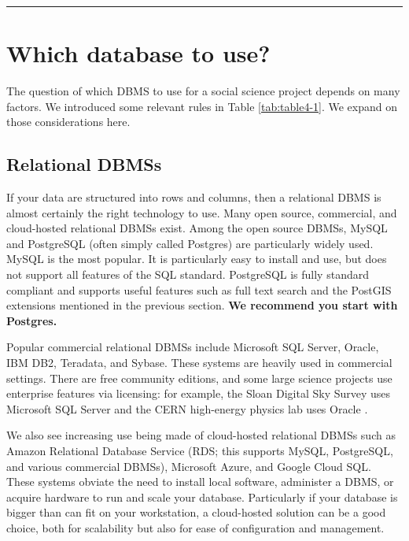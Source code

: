\documentclass[]{krantz}
\begin{document}
\begin{center}\rule{0.5\linewidth}{\linethickness}\end{center}

\section{Which database to use?}\label{which-database-to-use}

The question of which DBMS to use for a social science project depends
on many factors. We introduced some relevant rules in Table
\ref{tab:table4-1}. We expand on those considerations here.

\subsection{Relational DBMSs}\label{relational-dbmss-1}

If your data are structured into rows and columns, then a relational
DBMS is almost certainly the right technology to use. Many open source,
commercial, and cloud-hosted relational DBMSs exist. Among the open
source DBMSs, MySQL and PostgreSQL (often simply called Postgres) are
particularly widely used. MySQL is the most popular. It is particularly
easy to install and use, but does not support all features of the SQL
standard. PostgreSQL is fully standard compliant and supports useful
features such as full text search and the PostGIS extensions mentioned
in the previous section. \textbf{We recommend you start with Postgres.}

Popular commercial relational DBMSs include Microsoft SQL Server,
Oracle, IBM DB2, Teradata, and Sybase. These systems are heavily used in
commercial settings. There are free community editions, and some large
science projects use enterprise features via licensing: for example, the
Sloan Digital Sky Survey uses Microsoft SQL Server
\citep{szalay2002sdss} and the CERN high-energy physics lab uses Oracle
\citep{girone2008cern}.

We also see increasing use being made of cloud-hosted relational DBMSs
such as Amazon Relational Database Service (RDS; this supports MySQL,
PostgreSQL, and various commercial DBMSs), Microsoft Azure, and Google
Cloud SQL. These systems obviate the need to install local software,
administer a DBMS, or acquire hardware to run and scale your database.
Particularly if your database is bigger than can fit on your
workstation, a cloud-hosted solution can be a good choice, both for
scalability but also for ease of configuration and management.
\end{document}
